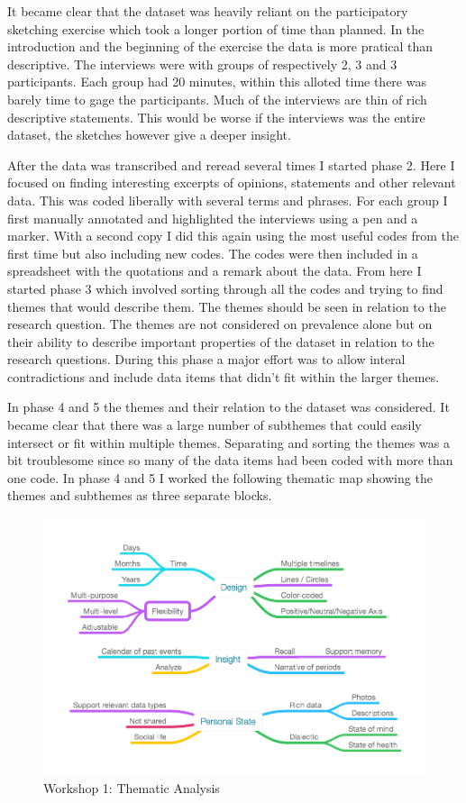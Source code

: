 \documentclass[UKenglish]{uiophd}
\begin{document}
		It became clear that the dataset was heavily reliant on the participatory sketching exercise which took a longer portion of time than planned. In the introduction and the beginning of the exercise the data is more pratical than descriptive. The interviews were with groups of respectively 2, 3 and 3 participants. Each group had 20 minutes, within this alloted time there was barely time to gage the participants. Much of the interviews are thin of rich descriptive statements. This would be worse if the interviews was the entire dataset, the sketches however give a deeper insight. 


		After the data was transcribed and reread several times I started phase 2. Here I focused on finding interesting excerpts of opinions, statements and other relevant data. This was coded liberally with several terms and phrases. For each group I first manually annotated and highlighted the interviews using a pen and a marker. With a second copy I did this again using the most useful codes from the first time but also including new codes. The codes were then included in a spreadsheet with the quotations and a remark about the data. 
		From here I started phase 3 which involved sorting through all the codes and trying to find themes that would describe them. The themes should be seen in relation to the research question. The themes are not considered on prevalence alone but on their ability to describe important properties of the dataset in relation to the research questions\cite[]{Braun2006Using}. During this phase a major effort was to allow interal contradictions and include data items that didn't fit within the larger themes. 

		In phase 4 and 5 the themes and their relation to the dataset was considered. It became clear that there was a large number of subthemes that could easily intersect or fit within multiple themes. Separating and sorting the themes was a bit troublesome since so many of the data items had been coded with more than one code. In phase 4 and 5 I worked the following thematic map showing the themes and subthemes as three separate blocks. 

		\begin{figure}
		    \centering
			\includegraphics[width=1\linewidth]{Images/ThematicAnalysis}
		    \caption{Workshop 1: Thematic Analysis}
		    \label{fig:1}
		\end{figure}
\end{document}
